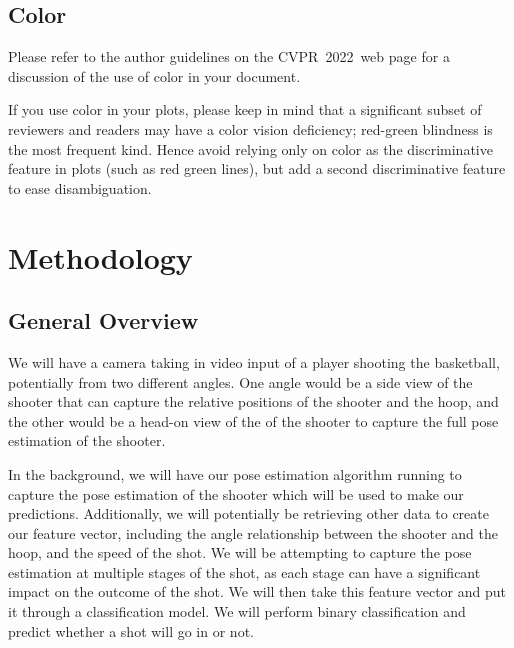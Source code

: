 \documentclass[10pt,twocolumn,letterpaper]{article}
\def\confName{CVPR}
\def\confYear{2022}
\begin{document}
\subsection{Color}

Please refer to the author guidelines on the \confName\ \confYear\ web page for a discussion of the use of color in your document.

If you use color in your plots, please keep in mind that a significant subset of reviewers and readers may have a color vision deficiency; red-green blindness is the most frequent kind.
Hence avoid relying only on color as the discriminative feature in plots (such as red \vs green lines), but add a second discriminative feature to ease disambiguation.

\section{Methodology}
\subsection{General Overview}
We will have a camera taking in video input of a player shooting the basketball, potentially from two different angles.
One angle would be a side view of the shooter that can capture the relative positions of the shooter and the hoop, and the other
would be a head-on view of the of the shooter to capture the full pose estimation of the shooter.

In the background, we will have our pose estimation algorithm running to capture the pose estimation of the shooter which will be used
to make our predictions. Additionally, we will potentially be retrieving other data to create our feature vector, including the angle relationship
between the shooter and the hoop, and the speed of the shot. We will be attempting to capture the pose estimation at multiple stages of the
shot, as each stage can have a significant impact on the outcome of the shot. We will then take this feature vector and put it through a classification model.
We will perform binary classification and predict whether a shot will go in or not.
\end{document}
